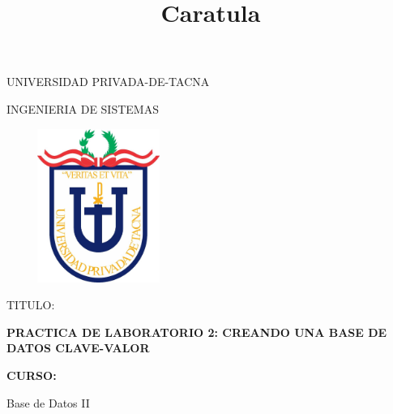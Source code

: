 \documentclass[12pt,letterpaper]{article}
\begin{document}
%


\title{Caratula}

\begin{titlepage}
\begin{center}
\large{UNIVERSIDAD PRIVADA-DE-TACNA}\\
\vspace*{-0.025in}
\begin{figure}[htb]
\begin{center}

\end{center}
\end{figure}


\vspace*{0.15in}
INGENIERIA DE SISTEMAS  \\
\begin{center}
    \includegraphics[width=6cm, height=5cm]{img/upt.jpg}  
\end{center}
\vspace*{0.5in}
\begin{large}
TITULO:\\
\end{large}

\vspace*{0.1in}
\begin{Large}
\textbf{PRACTICA DE LABORATORIO 2: CREANDO UNA BASE DE DATOS CLAVE-VALOR} \\
\end{Large}

\vspace*{0.3in}
\begin{Large}
\textbf{CURSO:} \\
\end{Large}

\vspace*{0.1in}
\begin{large}
    Base de Datos II\\
\end{large}


\end{center}
\end{titlepage}
\end{document}
